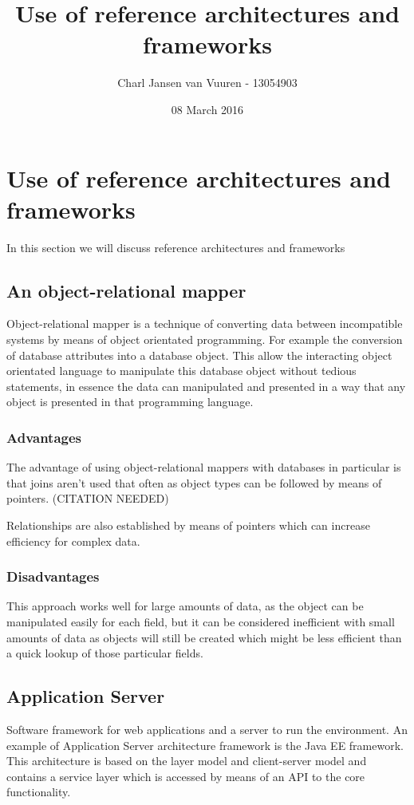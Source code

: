 \documentclass[12pt, letterpaper, twoside]{article}
\title{Use of reference architectures and frameworks}
\author{Charl Jansen van Vuuren - 13054903}
\date{08 March 2016}
\begin{document}
\section{Use of reference architectures and frameworks}
In this section we will discuss reference architectures and frameworks

\subsection{An object-relational mapper}
Object-relational mapper is a technique of converting data between incompatible systems by means of object orientated programming. For example the conversion of database attributes into a database object. This allow the interacting object orientated language to manipulate this database object without tedious statements, in essence the data can manipulated and presented in a way that any object is presented in that programming language.

\subsubsection{Advantages}
The advantage of using object-relational mappers with databases in particular is that joins aren't used that often as object types can be followed by means of pointers. (CITATION NEEDED)

Relationships are also established by means of pointers which can increase efficiency for complex data.

\subsubsection{Disadvantages}
This approach works well for large amounts of data, as the object can be manipulated easily for each field, but it can be considered inefficient with small amounts of data as objects will still be created which might be less efficient than a quick lookup of those particular fields. 

\subsection{Application Server}
Software framework for web applications and a server to run the environment. An example of Application Server architecture framework is the Java EE framework. This architecture is based on the layer model and client-server model and contains a service layer which is accessed by means of an API to the core functionality.
\end{document}
